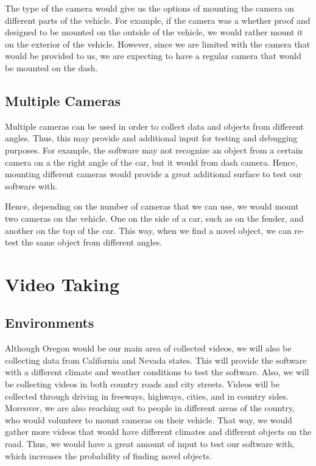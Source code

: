 \documentclass[10pt,draftclsnofoot,onecolumn,journal,compsoc]{IEEEtran}
\begin{document}
The type of the camera would give us the options of mounting the camera on different parts of the vehicle. For example, if the camera was a whether proof and designed to be mounted on the outside of the vehicle, we would rather mount it on the exterior of the vehicle. However, since we are limited with the camera that would be provided to us, we are expecting to have a regular camera that would be mounted on the dash.

\subsection{Multiple Cameras}
Multiple cameras can be used in order to collect data and objects from different angles. Thus, this may provide and additional input for testing and debugging purposes. For example, the software may not recognize an object from a certain camera on a the right angle of the car, but it would from dash camera. Hence, mounting different cameras would provide a great additional surface to test our software with.

Hence, depending on the number of cameras that we can use, we would mount two cameras on the vehicle. One on the side of a car, such as on the fender, and another on the top of the car. This way, when we find a novel object, we can re-test the same object from different angles.


\section{Video Taking}

\subsection{Environments}
Although Oregon would be our main area of collected videos, we will also be collecting data from California and Nevada states. This will provide the software with a different climate and weather conditions to test the software. Also, we will be collecting videos in both country roads and city streets. Videos will be collected through driving in freeways, highways, cities, and in country sides. 
\\
Moreover, we are also reaching out to people in different areas of the country, who would volunteer to mount cameras on their vehicle. That way, we would gather more videos that would have different climates and different objects on the road. Thus, we would have a great amount of input to test our software with, which increases the probability of finding novel objects.
\end{document}
